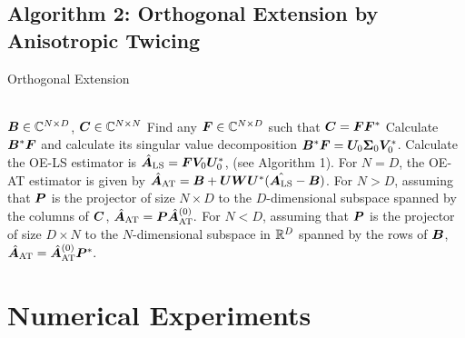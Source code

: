 \subsection{Algorithm 2: Orthogonal Extension by Anisotropic Twicing}
\begin{algorithm}
\caption{Orthogonal Extension}
\begin{algorithmic}[1]
\label{algo:OEAT}
\\
\Require $\boldsymbol{B} \in \mathbb{C}^{N \times D}$, $\boldsymbol{C} \in \mathbb{C}^{N \times N}$
\State Find any $\boldsymbol{F} \in \mathbb{C}^{N \times D}$ such that $\boldsymbol{C}=\boldsymbol{F} \boldsymbol{F}^*$
\State Calculate $\boldsymbol{B}^* \boldsymbol{F}$ and calculate its singular value decomposition 
$\boldsymbol{B}^*\boldsymbol{F}=\boldsymbol{U}_0\boldsymbol\Sigma_0\boldsymbol{V}_0^*$.
\State Calculate the OE-LS estimator is  
$\hat{\boldsymbol{A}}_{\text{LS}}=\boldsymbol{F}\boldsymbol{V}_0\boldsymbol{U}_0^*$, (see Algorithm 1).
\State For $N=D$, the OE-AT estimator is given by 
$\hat{\boldsymbol{A}}_{\text{AT}}=\boldsymbol{B}+\boldsymbol{U}\boldsymbol{W}\boldsymbol{U}^*(\hat{\boldsymbol{A}_{\text{LS}}}-\boldsymbol{B})$.
\State For $N>D$, assuming that $\boldsymbol{P}$ is the projector of size $N\times D$ to 
the $D$-dimensional subspace spanned by the columns of $\boldsymbol{C}$, 
$\hat{\boldsymbol{A}}_{\text{AT}}=\boldsymbol{P}\hat{\boldsymbol{A}}_{\text{AT}}^{(0)}.$
\State For $N<D$, assuming that $\boldsymbol{P}$ is the projector of size $D\times N$ to 
the $N$-dimensional subspace in $\mathbb{R}^D$ spanned by the rows of $\boldsymbol{B}$, 
$\hat{\boldsymbol{A}}_{\text{AT}}=\hat{\boldsymbol{A}}_{\text{AT}}^{(0)}\boldsymbol{P}^*.$
\EndProcedure
\end{algorithmic}
\end{algorithm}




\section{Numerical Experiments}
